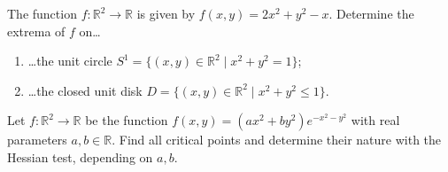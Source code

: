
\begin{exercise}
\label{ex:extrema_circle_disk}
The function $f : \mathbb{R}^2 \to \mathbb{R}$ is given by $f(x,y) = 2x^2+y^2-x$. Determine the
extrema of $f$ on\dots
\begin{enumerate}[label=\textbf{(\alph*)}]
  \item \dots the unit circle $S^1 = \{(x,y) \in \mathbb{R}^2 \mid x^2+y^2 = 1\}$;
  \item \dots the closed unit disk $D = \{(x,y) \in \mathbb{R}^2 \mid x^2+y^2 \leq 1\}$.
\end{enumerate}
\end{exercise}


\begin{exercise}
\label{ex:critical_points_parameterized_gaussian}
Let $f : \mathbb{R}^2 \to \mathbb{R}$ be the function $f(x,y) = (ax^2+by^2)e^{-x^2-y^2}$ with real
parameters $a, b \in \mathbb{R}$. Find all critical points and determine their nature with the
Hessian test, depending on $a, b$.
\end{exercise}

